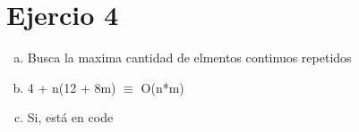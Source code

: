 \documentclass{article}
\begin{document}
\section*{Ejercio 4}

\begin{enumerate}[a)]
    \item Busca la maxima cantidad de elmentos continuos repetidos
    \item 4 + n(12 + 8m) $\equiv$ O(n*m)
    \item Si, está en code
\end{enumerate}
\end{document}
